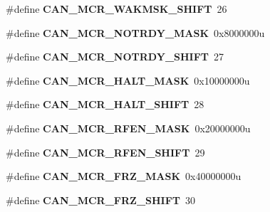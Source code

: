 \begin{DoxyCompactItemize}
\item 
\#define {\bfseries C\+A\+N\+\_\+\+M\+C\+R\+\_\+\+W\+A\+K\+M\+S\+K\+\_\+\+S\+H\+I\+FT}~26\hypertarget{group__CAN__Register__Masks_gac10449abdadabddb4aef81457dfb7449}{}\label{group__CAN__Register__Masks_gac10449abdadabddb4aef81457dfb7449}

\item 
\#define {\bfseries C\+A\+N\+\_\+\+M\+C\+R\+\_\+\+N\+O\+T\+R\+D\+Y\+\_\+\+M\+A\+SK}~0x8000000u\hypertarget{group__CAN__Register__Masks_ga013a34c0c5b808052d13ed4b9db2af75}{}\label{group__CAN__Register__Masks_ga013a34c0c5b808052d13ed4b9db2af75}

\item 
\#define {\bfseries C\+A\+N\+\_\+\+M\+C\+R\+\_\+\+N\+O\+T\+R\+D\+Y\+\_\+\+S\+H\+I\+FT}~27\hypertarget{group__CAN__Register__Masks_ga90886e532a436fbd5b6e94e723acd148}{}\label{group__CAN__Register__Masks_ga90886e532a436fbd5b6e94e723acd148}

\item 
\#define {\bfseries C\+A\+N\+\_\+\+M\+C\+R\+\_\+\+H\+A\+L\+T\+\_\+\+M\+A\+SK}~0x10000000u\hypertarget{group__CAN__Register__Masks_gad5282ba01498ad05fa9ce4387050f1df}{}\label{group__CAN__Register__Masks_gad5282ba01498ad05fa9ce4387050f1df}

\item 
\#define {\bfseries C\+A\+N\+\_\+\+M\+C\+R\+\_\+\+H\+A\+L\+T\+\_\+\+S\+H\+I\+FT}~28\hypertarget{group__CAN__Register__Masks_gab976a082962ddeb0a7738bc5385b35da}{}\label{group__CAN__Register__Masks_gab976a082962ddeb0a7738bc5385b35da}

\item 
\#define {\bfseries C\+A\+N\+\_\+\+M\+C\+R\+\_\+\+R\+F\+E\+N\+\_\+\+M\+A\+SK}~0x20000000u\hypertarget{group__CAN__Register__Masks_ga55cd060ac6cdad670aeb97522a118930}{}\label{group__CAN__Register__Masks_ga55cd060ac6cdad670aeb97522a118930}

\item 
\#define {\bfseries C\+A\+N\+\_\+\+M\+C\+R\+\_\+\+R\+F\+E\+N\+\_\+\+S\+H\+I\+FT}~29\hypertarget{group__CAN__Register__Masks_gaffab6b0e09ace8e09cb1487dd6639955}{}\label{group__CAN__Register__Masks_gaffab6b0e09ace8e09cb1487dd6639955}

\item 
\#define {\bfseries C\+A\+N\+\_\+\+M\+C\+R\+\_\+\+F\+R\+Z\+\_\+\+M\+A\+SK}~0x40000000u\hypertarget{group__CAN__Register__Masks_ga1b55e4024cec7ad30bcba945a70c3383}{}\label{group__CAN__Register__Masks_ga1b55e4024cec7ad30bcba945a70c3383}

\item 
\#define {\bfseries C\+A\+N\+\_\+\+M\+C\+R\+\_\+\+F\+R\+Z\+\_\+\+S\+H\+I\+FT}~30\hypertarget{group__CAN__Register__Masks_gae3aac50a6bba3516d60fd881e8a8b069}{}\label{group__CAN__Register__Masks_gae3aac50a6bba3516d60fd881e8a8b069}


\end{DoxyCompactItemize}

